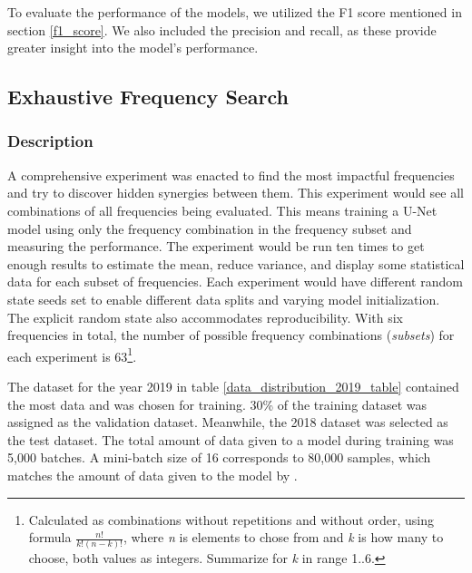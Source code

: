         To evaluate the performance of the models, we utilized the F1 score mentioned in section \ref{f1_score}. We also included the precision and recall, as these provide greater insight into the model's performance.
        
    
    \subsection{Exhaustive Frequency Search}
        \subsubsection{Description}
        A comprehensive experiment was enacted to find the most impactful frequencies and try to discover hidden synergies between them. This experiment would see all combinations of all frequencies being evaluated. This means training a U-Net model using only the frequency combination in the frequency subset and measuring  the performance. The experiment would be run ten times to get enough results to estimate the mean, reduce variance, and display some statistical data for each subset of frequencies. Each experiment would have different random state seeds set to enable different data splits and  varying model initialization. The explicit random state also accommodates reproducibility. With six frequencies in total, the number of possible frequency combinations (\textit{subsets}) for each experiment is 63\footnote{Calculated as combinations without repetitions and without order, using formula $\frac{n!}{k!(n-k)!}$, where \textit{n} is elements to chose from and \textit{k} is how many to choose, both values as integers. Summarize for \textit{k} in range 1..6.}.
        
        The dataset for the year 2019 in table \ref{data_distribution_2019_table} contained the most data and was chosen for training. 30\% of the training dataset was assigned as the validation dataset. Meanwhile, the 2018 dataset was selected as the test dataset. The total amount of data given to a model during training was 5,000 batches. A mini-batch size of 16 corresponds to 80,000 samples, which matches the amount of data given to the model by  \citeauthor{brautaset2020acoustic}\cite{brautaset2020acoustic}.
        
